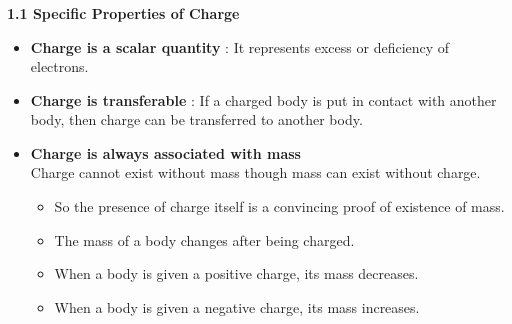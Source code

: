 \begin{frame}[t]
	\frametitle{}
	
	\noindent
	\textbf{1.1 Specific Properties of Charge}
	
	\vspace{0.7em}
	
	\begin{itemize}
		\item \textbf{Charge is a scalar quantity} : It represents excess or deficiency of electrons.
		
		\item \textbf{Charge is transferable} : If a charged body is put in contact with another body, then charge can be transferred to another body.
		
		\item \textbf{Charge is always associated with mass} \\
		Charge cannot exist without mass though mass can exist without charge.
		
		\vspace{0.3em}
		\begin{itemize}
			\item So the presence of charge itself is a convincing proof of existence of mass.
			\item The mass of a body changes after being charged.
			\item When a body is given a positive charge, its mass decreases.
			\item When a body is given a negative charge, its mass increases.
		\end{itemize}
	\end{itemize}
	
\end{frame}
